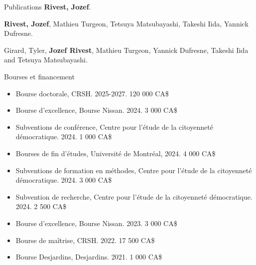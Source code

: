 \documentclass{resume} %
\begin{document}
\begin{rSection}{Publications}
{\textbf{Rivest, Jozef}. }

{\textbf{Rivest, Jozef}, Mathieu Turgeon, Tetsuya Matsubayashi, Takeshi Iida, Yannick Dufresne. }

{Girard, Tyler, \textbf{Jozef Rivest}, Mathieu Turgeon, Yannick Dufresne, Takeshi Iida and Tetsuya Matsubayashi. } \par 

\end{rSection}

\begin{rSection}{Bourses et financement}
\begin{itemize} 
  \item Bourse doctorale, CRSH. 2025-2027. 120 000 CA\$
  \item Bourse d'excellence, Bourse Nissan. 2024. 3 000 CA\$
  \item Subventions de conférence, Centre pour l'étude de la citoyenneté démocratique. 2024. 1 000 CA\$
  \item Bourses de fin d'études, Université de Montréal, 2024. 4 000 CA\$
  \item Subventions de formation en méthodes, Centre pour l'étude de la citoyenneté démocratique. 2024. 3 000 CA\$
  \item Subvention de recherche, Centre pour l'étude de la citoyenneté démocratique. 2024. 2 500 CA\$
  \item Bourse d'excellence, Bourse Nissan. 2023. 3 000 CA\$
  \item Bourse de maîtrise, CRSH. 2022. 17 500 CA\$
  \item Bourse Desjardins, Desjardins. 2021. 1 000 CA\$
\end{itemize}

\end{rSection}
\end{document}
